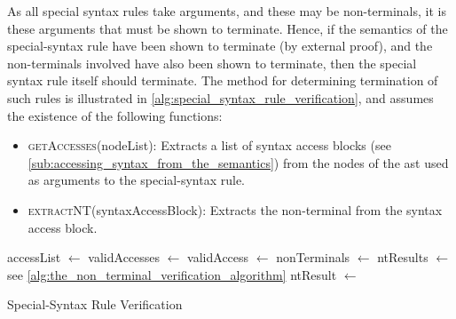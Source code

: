 As all special syntax rules take arguments, and these may be non-terminals, it is these arguments that must be shown to terminate. 
Hence, if the semantics of the special-syntax rule have been shown to terminate (by external proof), and the non-terminals involved have also been shown to terminate, then the special syntax rule itself should terminate.
The method for determining termination of such rules is illustrated in \autoref{alg:special_syntax_rule_verification}, and assumes the existence of the following functions:
\begin{itemize}
    \item \textsc{getAccesses}(nodeList): Extracts a list of syntax access blocks (see \autoref{sub:accessing_syntax_from_the_semantics}) from the nodes of the \gls{ast} used as arguments to the special-syntax rule.
    \item \textsc{extractNT}(syntaxAccessBlock): Extracts the non-terminal from the syntax access block.
\end{itemize}

\begin{algorithm}
\begin{algorithmic}
    \State accessList $\gets$ 
    \State validAccesses $\gets$ 
    \State validAccess $\gets$ 
    \State nonTerminals $\gets$ 
    \State ntResults $\gets$ 
    \Comment see \autoref{alg:the_non_terminal_verification_algorithm}
    \State ntResult $\gets$ 
    \State
        \State {}
    \Else
        \State {}
    \EndIf
\EndFunction
\end{algorithmic}
\caption{Special-Syntax Rule Verification}
\label{alg:special_syntax_rule_verification}
\end{algorithm}


